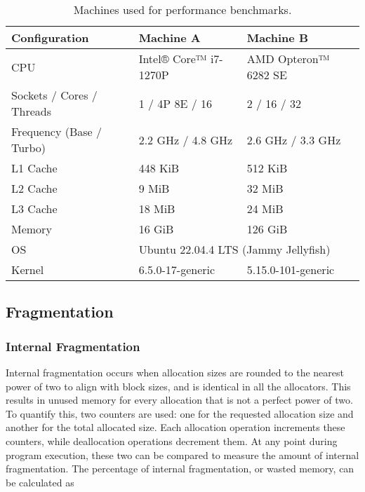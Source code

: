 \begin{table}[h]
    \begin{tabular}{lll}
        \textbf{Configuration}    & \textbf{Machine A}                                       & \textbf{Machine B}   \\ \hline
        CPU                       & Intel® Core™ i7-1270P                                    & AMD Opteron™ 6282 SE \\ \hline
        Sockets / Cores / Threads & 1 / 4P 8E / 16                                           & 2 / 16 / 32          \\ \hline
        Frequency (Base / Turbo)  & 2.2 GHz / 4.8 GHz                                        & 2.6 GHz / 3.3 GHz    \\ \hline
        L1 Cache                  & 448 KiB                                                  & 512 KiB              \\ \hline
        L2 Cache                  & 9 MiB                                                    & 32 MiB               \\ \hline
        L3 Cache                  & 18 MiB                                                   & 24 MiB               \\ \hline
        Memory                    & 16 GiB                                                   & 126 GiB              \\ \hline
        OS                        & \multicolumn{2}{l}{Ubuntu 22.04.4 LTS (Jammy Jellyfish)}                        \\ \hline
        Kernel                    & 6.5.0-17-generic                                         & 5.15.0-101-generic   \\
    \end{tabular}
    \centering
    \caption{Machines used for performance benchmarks.}
    \label{table:performancespecs}
\end{table}

\subsection{Fragmentation} \label{sec:frageval}
\subsubsection{Internal Fragmentation}
Internal fragmentation occurs when allocation sizes are rounded to the nearest power of two to align with block sizes, and is identical in all the allocators. This results in unused memory for every allocation that is not a perfect power of two. To quantify this, two counters are used: one for the requested allocation size and another for the total allocated size. Each allocation operation increments these counters, while deallocation operations decrement them. At any point during program execution, these two can be compared to measure the amount of internal fragmentation. The percentage of internal fragmentation, or wasted memory, can be calculated as


